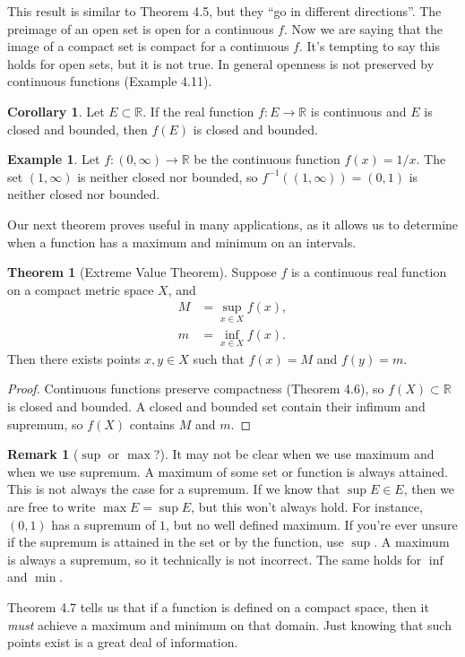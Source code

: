 \documentclass{article}
\newcommand{\R}{\mathbb{R}}
\theoremstyle{definition}
\newtheorem{theorem}{Theorem}[section]
\newtheorem{corollary}{Corollary}[section]
\newtheorem{example}{Example}[section]
\newtheorem{remark}{Remark}[section]
\begin{document}
	This result is similar to Theorem 4.5, but they ``go in different directions''. The preimage of an open set is open for a continuous $ f $. Now we are saying that the image of a compact set is compact for a continuous $ f $. It's tempting to say this holds for open sets, but it is not true. In general openness is not preserved by continuous functions (Example 4.11).
	\begin{corollary}
		Let $ E\subset\R $. If the real function $ f:E\to\R $ is continuous and $ E $ is closed and bounded, then $ f(E) $ is closed and bounded.
	\end{corollary}
	\begin{example}
		Let $ f:(0,\infty)\to\R $ be the continuous function $ f(x)=1/x $. The set $ (1,\infty) $ is neither closed nor bounded, so $ f^{-1}((1,\infty))=(0,1) $ is neither closed nor bounded. 
	\end{example}
	Our next theorem proves useful in many applications, as it allows us to determine when a function has a maximum and minimum on an intervals. 
	\begin{theorem}[Extreme Value Theorem]
		Suppose $ f $ is a continuous real function on a compact metric space $ X $, and \begin{align*}
			M&=\sup\limits_{x\in X}f(x),\\
			m&=\inf\limits_{x\in X}f(x).
		\end{align*}
		Then there exists points $ x,y\in X $ such that $ f(x)=M $ and $ f(y)=m $.
	\end{theorem}
	\begin{proof}
		Continuous functions preserve compactness (Theorem 4.6), so $ f(X)\subset\R $ is closed and bounded. A closed and bounded set contain their infimum and supremum, so $ f(X) $ contains $ M $ and $ m $. 
	\end{proof}
	\begin{remark}[$ \sup $ or $ \max $?]
		It may not be clear when we use maximum and when we use supremum. A maximum of some set or function is always attained. This is not always the case for a supremum. If we know that $ \sup E\in E $, then we are free to write $ \max E=\sup E $, but this won't always hold. For instance, $ (0,1) $ has a supremum of $ 1 $, but no well defined maximum. If you're ever unsure if the supremum is attained in the set or by the function, use $ \sup $. A maximum is always a supremum, so it technically is not incorrect. The same holds for $ \inf $ and $ \min $.
	\end{remark}
	Theorem 4.7 tells us that if a function is defined on a compact space, then it \textit{must} achieve a maximum and minimum on that domain. Just knowing that such points exist is a great deal of information. 
\end{document}
